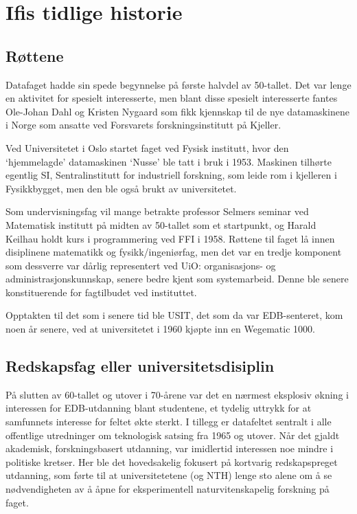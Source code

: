 \chapter{Ifis tidlige historie}

\author{Skrevet av Narve Trædal}

\section{Røttene}

Datafaget hadde sin spede begynnelse på første halvdel av 50-tallet. Det var lenge en  aktivitet for spesielt interesserte, men blant disse spesielt interesserte fantes Ole-Johan Dahl og Kristen Nygaard som fikk kjennskap til de nye datamaskinene i Norge som ansatte ved Forsvarets forskningsinstitutt på Kjeller. 

Ved Universitetet i Oslo startet faget ved Fysisk institutt, hvor den `hjemmelagde' datamaskinen `Nusse' ble tatt i bruk i 1953. Maskinen tilhørte egentlig SI, Sentralinstitutt for industriell forskning, som leide rom i kjelleren i Fysikkbygget, men den ble også brukt av universitetet. 

Som undervisningsfag vil mange betrakte professor Selmers seminar ved Matematisk institutt på midten av 50-tallet som et startpunkt, og Harald Keilhau holdt kurs i programmering ved FFI i 1958. Røttene til faget lå innen disiplinene matematikk og fysikk/ingeniørfag, men det var en tredje komponent som dessverre var dårlig representert ved UiO: organisasjons- og administrasjonskunnskap, senere bedre kjent som systemarbeid. Denne ble senere konstituerende for fagtilbudet ved instituttet. 

Opptakten til det som i senere tid ble USIT, det som da var EDB-senteret, kom noen år senere, ved at universitetet i 1960 kjøpte inn en Wegematic 1000.

\section{Redskapsfag eller universitetsdisiplin}

På slutten av 60-tallet og utover i 70-årene var det en nærmest eksplosiv økning i interessen for EDB-utdanning blant studentene, et tydelig uttrykk for at samfunnets interesse for feltet økte sterkt. I tillegg er datafeltet sentralt i alle offentlige utredninger om teknologisk satsing fra 1965 og utover. Når det gjaldt akademisk, forskningsbasert utdanning, var imidlertid interessen noe mindre i politiske kretser. Her ble det hovedsakelig fokusert på kortvarig redskapspreget utdanning, som førte til at universitetetene (og NTH) lenge sto alene om å se nødvendigheten av å åpne for eksperimentell naturvitenskapelig forskning på faget.

